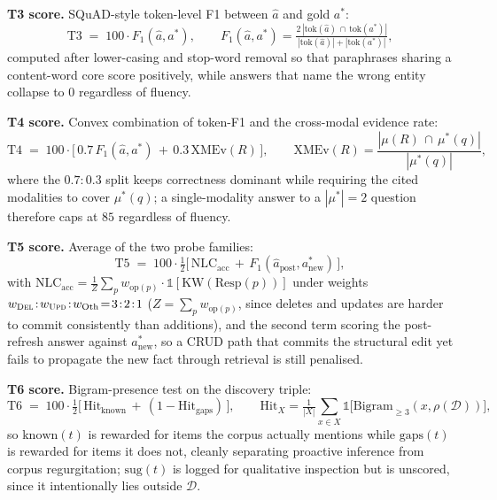 \documentclass{article}
\begin{document}
\noindent\textbf{T3 score.} SQuAD-style token-level F1 between $\hat{a}$ and gold $a^{*}$:
\begin{equation}
\mathrm{T3} \;=\; 100\cdot F_1(\hat{a},a^{*}),\qquad F_1(\hat{a},a^{*})\!=\!\tfrac{2\,|\mathrm{tok}(\hat{a})\,\cap\,\mathrm{tok}(a^{*})|}{|\mathrm{tok}(\hat{a})|+|\mathrm{tok}(a^{*})|},
\label{eq:m-t3}
\end{equation}
computed after lower-casing and stop-word removal so that paraphrases sharing a content-word core score positively, while answers that name the wrong entity collapse to $0$ regardless of fluency.

\noindent\textbf{T4 score.} Convex combination of token-F1 and the cross-modal evidence rate:
\begin{equation}
\mathrm{T4} \;=\; 100\cdot\bigl[\,0.7\,F_1(\hat{a},a^{*})\,+\,0.3\,\mathrm{XMEv}(R)\,\bigr],\qquad \mathrm{XMEv}(R)\!=\!\frac{|\mu(R)\,\cap\,\mu^{*}(q)|}{|\mu^{*}(q)|},
\label{eq:m-t4}
\end{equation}
where the $0.7\!:\!0.3$ split keeps correctness dominant while requiring the cited modalities to cover $\mu^{*}(q)$; a single-modality answer to a $|\mu^{*}|\!=\!2$ question therefore caps at $85$ regardless of fluency.

\noindent\textbf{T5 score.} Average of the two probe families:
\begin{equation}
\mathrm{T5} \;=\; 100\cdot\tfrac{1}{2}\bigl[\,\mathrm{NLC}_{\mathrm{acc}}\,+\,F_1(\hat{a}_{\mathrm{post}},a^{*}_{\mathrm{new}})\,\bigr],
\label{eq:m-t5}
\end{equation}
with $\mathrm{NLC}_{\mathrm{acc}}\!=\!\frac{1}{Z}\!\sum_{p}\!w_{\mathrm{op}(p)}\!\cdot\!\mathbb{1}[\mathrm{KW}(\mathrm{Resp}(p))]$ under weights $w_{\textsc{Del}}\!:\!w_{\textsc{Upd}}\!:\!w_{\mathrm{Oth}}\!=\!3\!:\!2\!:\!1$ ($Z\!=\!\sum_p w_{\mathrm{op}(p)}$, since deletes and updates are harder to commit consistently than additions), and the second term scoring the post-refresh answer against $a^{*}_{\mathrm{new}}$, so a CRUD path that commits the structural edit yet fails to propagate the new fact through retrieval is still penalised.

\noindent\textbf{T6 score.} Bigram-presence test on the discovery triple:
\begin{equation}
\mathrm{T6} \;=\; 100\cdot\tfrac{1}{2}\bigl[\,\mathrm{Hit}_{\mathrm{known}}\,+\,(1\!-\!\mathrm{Hit}_{\mathrm{gaps}})\,\bigr],\qquad \mathrm{Hit}_X\!=\!\tfrac{1}{|X|}\!\sum_{x\in X}\!\mathbb{1}\!\bigl[\mathrm{Bigram}_{\geq3}(x,\rho(\mathcal{D}))\bigr],
\label{eq:m-t6}
\end{equation}
so $\mathrm{known}(t)$ is rewarded for items the corpus actually mentions while $\mathrm{gaps}(t)$ is rewarded for items it does not, cleanly separating proactive inference from corpus regurgitation; $\mathrm{sug}(t)$ is logged for qualitative inspection but is unscored, since it intentionally lies outside $\mathcal{D}$.
\end{document}
